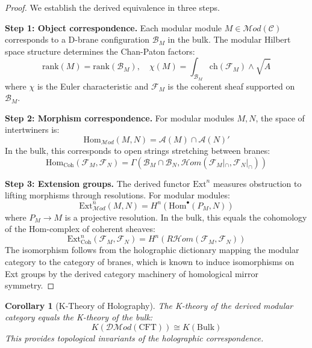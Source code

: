 \documentclass[12pt,a4paper]{article}
\newtheorem{corollary}[theorem]{Corollary}
\begin{document}
\begin{proof}
We establish the derived equivalence in three steps.

\textbf{Step 1: Object correspondence.}
Each modular module $M \in \mathcal{M}od(\mathcal{C})$ corresponds to a D-brane configuration $\mathcal{B}_M$ in the bulk. The modular Hilbert space structure determines the Chan-Paton factors:
\begin{equation}
\text{rank}(M) = \text{rank}(\mathcal{B}_M), \quad \chi(M) = \int_{\mathcal{B}_M} \text{ch}(\mathcal{F}_M) \wedge \sqrt{\hat{A}}
\end{equation}
where $\chi$ is the Euler characteristic and $\mathcal{F}_M$ is the coherent sheaf supported on $\mathcal{B}_M$.

\textbf{Step 2: Morphism correspondence.}
For modular modules $M, N$, the space of intertwiners is:
\begin{equation}
\text{Hom}_{\mathcal{M}od}(M, N) = \mathcal{A}(M) \cap \mathcal{A}(N)'
\end{equation}
In the bulk, this corresponds to open strings stretching between branes:
\begin{equation}
\text{Hom}_{\text{Coh}}(\mathcal{F}_M, \mathcal{F}_N) = \Gamma(\mathcal{B}_M \cap \mathcal{B}_N, \mathcal{H}om(\mathcal{F}_M|_{\cap}, \mathcal{F}_N|_{\cap}))
\end{equation}

\textbf{Step 3: Extension groups.}
The derived functor $\text{Ext}^n$ measures obstruction to lifting morphisms through resolutions. For modular modules:
\begin{equation}
\text{Ext}^n_{\mathcal{M}od}(M, N) = H^n(\text{Hom}^\bullet(P_M, N))
\end{equation}
where $P_M \to M$ is a projective resolution. In the bulk, this equals the cohomology of the Hom-complex of coherent sheaves:
\begin{equation}
\text{Ext}^n_{\text{Coh}}(\mathcal{F}_M, \mathcal{F}_N) = H^n(R\mathcal{H}om(\mathcal{F}_M, \mathcal{F}_N))
\end{equation}
The isomorphism follows from the holographic dictionary mapping the modular category to the category of branes, which is known to induce isomorphisms on Ext groups by the derived category machinery of homological mirror symmetry.
\end{proof}

\begin{corollary}[K-Theory of Holography]
The K-theory of the derived modular category equals the K-theory of the bulk:
\begin{equation}
K(\mathcal{D}\mathcal{M}od(\text{CFT})) \cong K(\text{Bulk})
\end{equation}
This provides topological invariants of the holographic correspondence.
\end{corollary}
\end{document}
